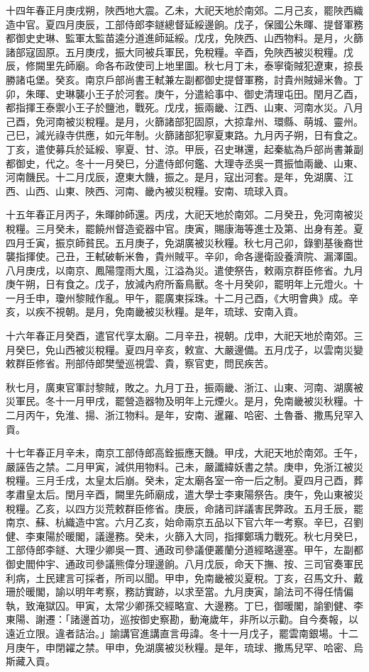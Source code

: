 \begin{pinyinscope}
十四年春正月庚戌朔，陜西地大震。乙未，大祀天地於南郊。二月己亥，罷陜西織造中官。夏四月庚辰，工部侍郎李鐩總督延綏邊餉。戊子，保國公朱暉、提督軍務都御史史琳、監軍太監苗逵分道進師延綏。戊戌，免陜西、山西物料。是月，火篩諸部寇固原。五月庚戌，振大同被兵軍民，免稅糧。辛酉，免陜西被災稅糧。戊辰，修闕里先師廟。命各布政使司上地里圖。秋七月丁未，泰寧衛賊犯遼東，掠長勝諸屯堡。癸亥。南京戶部尚書王軾兼左副都御史提督軍務，討貴州賊婦米魯。丁卯，朱暉、史琳襲小王子於河套。庚午，分遣給事中、御史清理屯田。閏月乙酉，都指揮王泰禦小王子於鹽池，戰死。戊戌，振兩畿、江西、山東、河南水災。八月己酉，免河南被災稅糧。是月，火篩諸部犯固原，大掠韋州、環縣、萌城、靈州。己巳，減光祿寺供應，如元年制。火篩諸部犯寧夏東路。九月丙子朔，日有食之。丁亥，遣使募兵於延綏、寧夏、甘、涼。甲辰，召史琳還，起秦紘為戶部尚書兼副都御史，代之。冬十一月癸巳，分遣侍郎何鑑、大理寺丞吳一貫振恤兩畿、山東、河南饑民。十二月戊辰，遼東大饑，振之。是月，寇出河套。是年，免湖廣、江西、山西、山東、陜西、河南、畿內被災稅糧。安南、琉球入貢。

十五年春正月丙子，朱暉帥師還。丙戌，大祀天地於南郊。二月癸丑，免河南被災稅糧。三月癸未，罷饒州督造瓷器中官。庚寅，賜康海等進士及第、出身有差。夏四月壬寅，振京師貧民。五月庚子，免湖廣被災秋糧。秋七月己卯，錄劉基後裔世襲指揮使。己丑，王軾破斬米魯，貴州賊平。辛卯，命各邊衛設養濟院、漏澤園。八月庚戌，以南京、鳳陽霪雨大風，江溢為災。遣使祭告，敕兩京群臣修省。九月庚午朔，日有食之。戊子，放減內府所畜鳥獸。冬十月癸卯，罷明年上元燈火。十一月壬申，瓊州黎賊作亂。甲午，罷廣東採珠。十二月己酉，《大明會典》成。辛亥，以疾不視朝。是月，免南畿被災秋糧。是年，琉球、安南入貢。

十六年春正月癸酉，遣官代享太廟。二月辛丑，視朝。戊申，大祀天地於南郊。三月癸巳，免山西被災稅糧。夏四月辛亥，敕宣、大嚴邊備。五月戊子，以雲南災變敕群臣修省。刑部侍郎樊瑩巡視雲、貴，察官吏，問民疾苦。

秋七月，廣東官軍討黎賊，敗之。九月丁丑，振兩畿、浙江、山東、河南、湖廣被災軍民。冬十一月甲戌，罷營造器物及明年上元煙火。是月，免南畿被災秋糧。十二月丙午，免淮、揚、浙江物料。是年，安南、暹羅、哈密、土魯番、撒馬兒罕入貢。

十七年春正月辛未，南京工部侍郎高銓振應天饑。甲戌，大祀天地於南郊。壬午，嚴誣告之禁。二月甲寅，減供用物料。己未，嚴讖緯妖書之禁。庚申，免浙江被災稅糧。三月壬戌，太皇太后崩。癸未，定太廟各室一帝一后之制。夏四月己酉，葬孝肅皇太后。閏月辛酉，闕里先師廟成，遣大學士李東陽祭告。庚午，免山東被災稅糧。乙亥，以四方災荒敕群臣修省。庚辰，命諸司詳議害民弊政。五月壬辰，罷南京、蘇、杭織造中宮。六月乙亥，始命兩京五品以下官六年一考察。辛巳，召劉健、李東陽於暖閣，議邊務。癸未，火篩入大同，指揮鄭瑀力戰死。秋七月癸巳，工部侍郎李鐩、大理少卿吳一貫、通政司參議便叢蘭分道經略邊塞。甲午，左副都御史閻仲宇、通政司參議熊偉分理邊餉。八月戊辰，命天下撫、按、三司官奏軍民利病，土民建言可採者，所司以聞。甲申，免南畿被災夏稅。丁亥，召馬文升、戴珊於暖閣，諭以明年考察，務訪實跡，以求至當。九月庚寅，諭法司不得任情偏執，致淹獄囚。甲寅，太常少卿孫交經略宣、大邊務。丁巳，御暖閣，諭劉健、李東陽、謝遷：「諸邊首功，巡按御史察勘，動淹歲年，非所以示勸。自今奏報，以遠近立限。違者詰治。」諭講官進講直言毋諱。冬十一月戊子，罷雲南銀場。十二月庚午，申閉糴之禁。甲申，免湖廣被災秋糧。是年，琉球、撒馬兒罕、哈密、烏斯藏入貢。


\end{pinyinscope}
